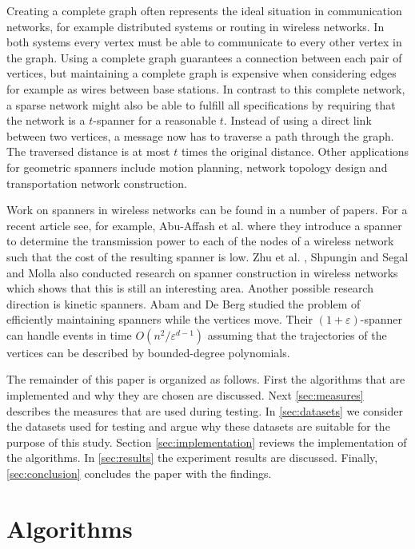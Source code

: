 \documentclass[a4paper,twoside,11pt,hidelinks]{article}
\theoremstyle{plain}
\theoremstyle{definition}  %
\begin{document}
Creating a complete graph often represents the ideal situation in communication networks, for example distributed systems or routing in wireless networks. In both systems every vertex must be able to communicate to every other vertex in the graph. Using a complete graph guarantees a connection between each pair of vertices, but maintaining a complete graph is expensive when considering edges for example as wires between base stations. In contrast to this complete network, a sparse network might also be able to fulfill all specifications by requiring that the network is a $t$-spanner for a reasonable $t$. Instead of using a direct link between two vertices, a message now has to traverse a path through the graph. The traversed distance is at most $t$ times the original distance. Other applications for geometric spanners include motion planning, network topology design and transportation network construction.

Work on spanners in wireless networks can be found in a number of papers. For a recent article see, for example, Abu-Affash et al. \cite{abu2011minimum} where they introduce a spanner to determine the transmission power to each of the nodes of a wireless network such that the cost of the resulting spanner is low. Zhu et al. \cite{zhu2011cooperative}, Shpungin and Segal \cite{shpungin2010near} and Molla \cite{el2009yao} also conducted research on spanner construction in wireless networks which shows that this is still an interesting area. Another possible research direction is kinetic spanners. Abam and De Berg \cite{abam2009kinetic} studied the problem of efficiently maintaining spanners while the vertices move. Their $(1+\varepsilon)$-spanner can handle events in time $O(n^{2}/\varepsilon^{d-1})$ assuming that the trajectories of the vertices can be described by bounded-degree polynomials. 

The remainder of this paper is organized as follows. First the algorithms that are implemented and why they are chosen are discussed. Next \autoref{sec:measures} describes the measures that are used during testing. In \autoref{sec:datasets} we consider the datasets used for testing and argue why these datasets are suitable for the purpose of this study. Section \ref{sec:implementation} reviews the implementation of the algorithms. In \autoref{sec:results} the experiment results are discussed. Finally, \autoref{sec:conclusion} concludes the paper with the findings. 

\section{Algorithms}
\label{sec:algorithms}
\end{document}
